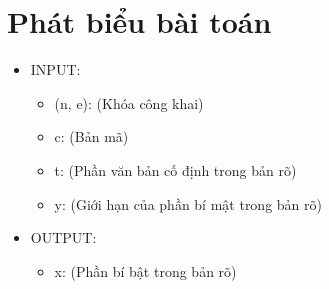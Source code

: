 \documentclass{article}
\begin{document}

\section{Phát biểu bài toán}
\begin{itemize}
\item INPUT:

\begin{itemize}
\item (n, e): (Khóa công khai)
\item c: (Bản mã)
\item t: (Phần văn bản cố định trong bản rõ)
\item y: (Giới hạn của phần bí mật trong bản rõ)
\end{itemize}

\item OUTPUT:
\begin{itemize}
\item x: (Phần bí bật trong bản rõ)
\end{itemize}
\end{itemize}

\end{document}
